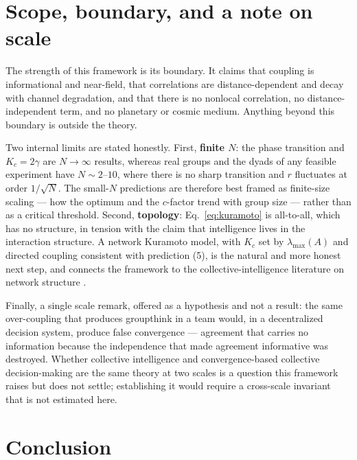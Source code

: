 \documentclass[11pt]{article}
\begin{document}
\section{Scope, boundary, and a note on scale}
\label{sec:scope}

The strength of this framework is its boundary. It claims that coupling is informational and near-field, that correlations are distance-dependent and decay with channel degradation, and that there is no nonlocal correlation, no distance-independent term, and no planetary or cosmic medium. Anything beyond this boundary is outside the theory.

Two internal limits are stated honestly. First, \textbf{finite $N$}: the phase transition and $K_c = 2\gamma$ are $N\to\infty$ results, whereas real groups and the dyads of any feasible experiment have $N \sim 2$--$10$, where there is no sharp transition and $r$ fluctuates at order $1/\sqrt{N}$. The small-$N$ predictions are therefore best framed as finite-size scaling --- how the optimum and the $c$-factor trend with group size --- rather than as a critical threshold. Second, \textbf{topology}: Eq.~\eqref{eq:kuramoto} is all-to-all, which has no structure, in tension with the claim that intelligence lives in the interaction structure. A network Kuramoto model, with $K_c$ set by $\lambda_{\max}(A)$ \citep{restrepo2005onset} and directed coupling consistent with prediction (5), is the natural and more honest next step, and connects the framework to the collective-intelligence literature on network structure \citep{lazer2007network, becker2017network}.

Finally, a single scale remark, offered as a hypothesis and not a result: the same over-coupling that produces groupthink in a team would, in a decentralized decision system, produce false convergence --- agreement that carries no information because the independence that made agreement informative was destroyed. Whether collective intelligence and convergence-based collective decision-making are the same theory at two scales is a question this framework raises but does not settle; establishing it would require a cross-scale invariant that is not estimated here.

\section{Conclusion}
\end{document}
